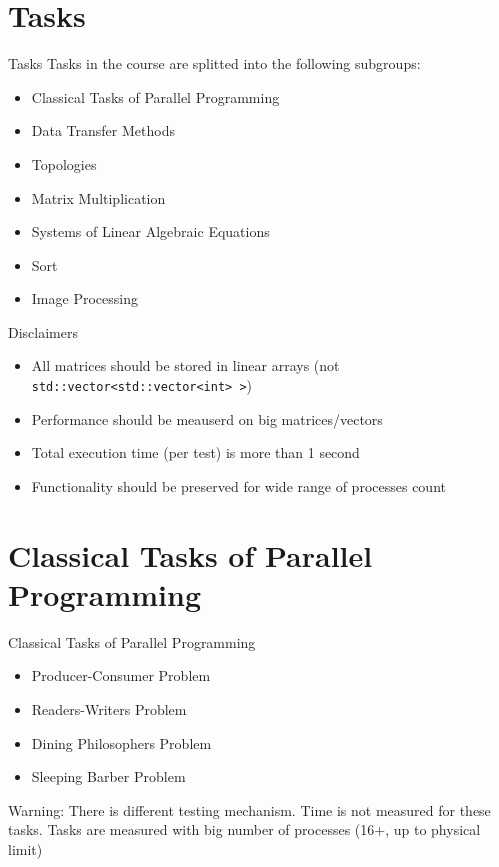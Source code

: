 \documentclass{beamer}
\begin{document}
\section{Tasks}

\begin{frame}{Tasks}
  Tasks in the course are splitted into the following subgroups:
  \begin{itemize}
    \item Classical Tasks of Parallel Programming
    \item Data Transfer Methods
    \item Topologies
    \item Matrix Multiplication
    \item Systems of Linear Algebraic Equations
    \item Sort
    \item Image Processing
  \end{itemize}
\end{frame}

\begin{frame}{Disclaimers}
  \begin{itemize}
    \item All matrices should be stored in linear arrays (not \texttt{std::vector<std::vector<int> >})
    \item Performance should be meauserd on big matrices/vectors
    \item Total execution time (per test) is more than 1 second
    \item Functionality should be preserved for wide range of processes count
  \end{itemize}
\end{frame}

\section{Classical Tasks of Parallel Programming}

\begin{frame}{Classical Tasks of Parallel Programming}
  \begin{itemize}
    \item Producer-Consumer Problem
    \item Readers-Writers Problem
    \item Dining Philosophers Problem
    \item Sleeping Barber Problem
  \end{itemize}
  Warning:
  There is different testing mechanism. Time is not measured for these tasks.
  Tasks are measured with big number of processes (16+, up to physical limit)
\end{frame}
\end{document}
